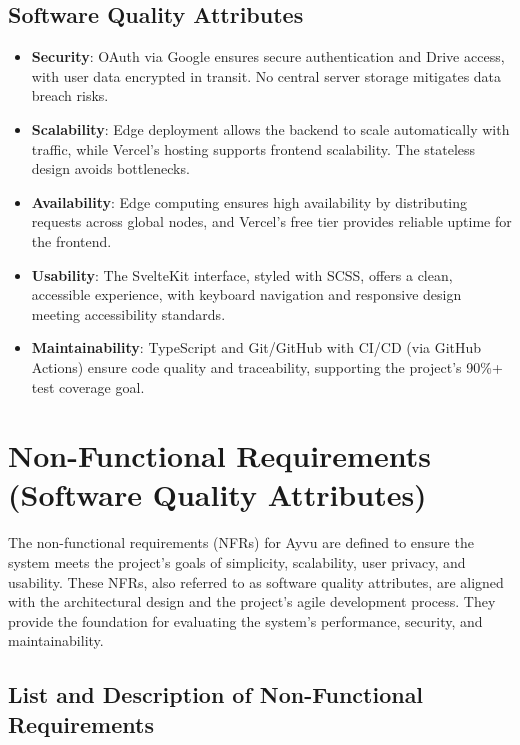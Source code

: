 \documentclass[12pt]{article}
\begin{document}
\subsection{Software Quality Attributes}
\begin{itemize}
  \item \textbf{Security}: OAuth via Google ensures secure authentication and Drive access, with user data encrypted in transit. No central server storage mitigates data breach risks.
  \item \textbf{Scalability}: Edge deployment allows the backend to scale automatically with traffic, while Vercel's hosting supports frontend scalability. The stateless design avoids bottlenecks.
  \item \textbf{Availability}: Edge computing ensures high availability by distributing requests across global nodes, and Vercel's free tier provides reliable uptime for the frontend.
  \item \textbf{Usability}: The SvelteKit interface, styled with SCSS, offers a clean, accessible experience, with keyboard navigation and responsive design meeting accessibility standards.
  \item \textbf{Maintainability}: TypeScript and Git/GitHub with CI/CD (via GitHub Actions) ensure code quality and traceability, supporting the project's 90\%+ test coverage goal.
\end{itemize}

\section{Non-Functional Requirements (Software Quality Attributes)}

The non-functional requirements (NFRs) for Ayvu are defined to ensure the system meets the project's goals of simplicity, scalability, user privacy, and usability. These NFRs, also referred to as software quality attributes, are aligned with the architectural design and the project's agile development process. They provide the foundation for evaluating the system's performance, security, and maintainability.

\subsection{List and Description of Non-Functional Requirements}
\end{document}
